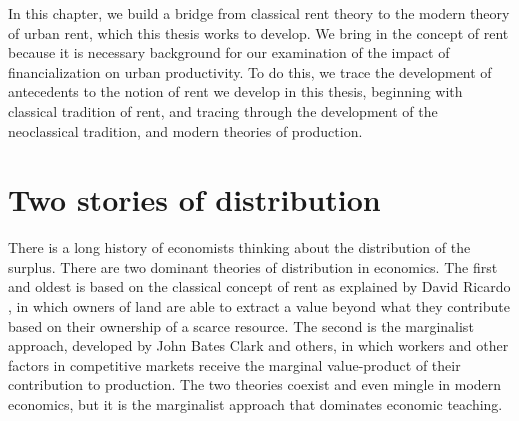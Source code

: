 In this chapter, we build a bridge from \gls{classical rent theory} to the modern theory of urban rent, which this thesis works to develop. 
We bring in the concept of rent because it is necessary background for our examination of the impact of \gls{financialization} on urban productivity. To do this, we trace the development of antecedents to the notion of rent we develop in this thesis, beginning with classical tradition of rent, and tracing through the development of the neoclassical tradition, and modern theories of production. 





\section{Two stories of distribution}
There is a long history of economists thinking about the distribution of the surplus. %
There are two dominant theories of \gls{distribution} in economics. The first and oldest is based on the classical concept of rent as explained  by David Ricardo \cite{ricardoEssayInfluenceLow1815}, in which owners of land are able to extract a value beyond what they contribute based on their ownership of a scarce resource. The second is the marginalist approach, developed by John Bates Clark and others, in which workers and other factors  in competitive markets receive the \gls{marginal value-product} of their contribution to production. The two theories coexist and even mingle in modern economics, but it is the marginalist approach that dominates economic teaching. 

